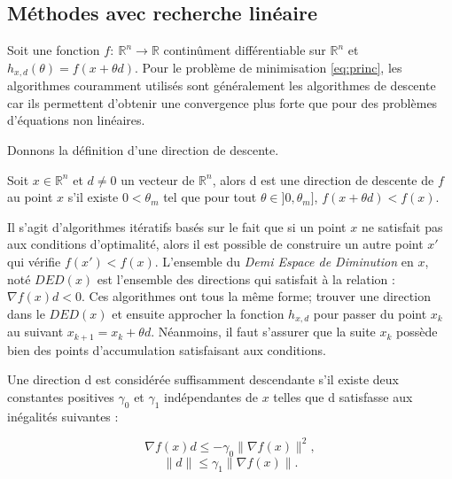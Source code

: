 \subsection{M\'ethodes avec recherche lin\'eaire}
Soit une fonction $f:\ \mathbb{R}^n \rightarrow \mathbb{R}$ continûment diff\'erentiable sur $\mathbb{R}^n$ et \\
$h_{x,d}(\theta)=f(x+\theta d)$.
Pour le probl\`eme de minimisation \eqref{eq:princ}, les algorithmes couramment utilis\'es sont g\'en\'eralement les algorithmes de
descente car ils permettent d'obtenir une convergence plus forte que pour des probl\`emes d'\'equations
non lin\'eaires.





 Donnons la d\'efinition d'une direction de descente.

\begin{frdefinition}
\label{def:1}
Soit $x \in \mathbb{R}^n$ et $d \neq 0$ un vecteur de $\mathbb{R}^n$, alors d est une direction de
descente de $f$ au point $x$ s'il existe $0<\theta_m$ tel que pour tout $\theta \in ]0,\theta_m]$,
$f(x+\theta d)<f(x)$. \\
\end{frdefinition}
%
Il s'agit d'algorithmes it\'eratifs bas\'es sur le fait que si un point $x$ ne satisfait pas aux conditions d'optimalit\'e, alors il est
possible de construire un autre point $x'$ qui v\'erifie $f(x')<f(x)$.
L'ensemble du {\it Demi Espace de Diminution} en $x$, not\'e $DED(x)$ est l'ensemble des directions qui satisfait \`a la relation :
$\nabla f(x)d<0$. Ces algorithmes ont tous la même forme;  trouver une direction dans le $DED(x)$ et
ensuite approcher la fonction $h_{x,d}$ pour passer du point $x_k$ au suivant $x_{k+1}=x_k+\theta d$. N\'eanmoins, il faut s'assurer que la suite ${x_k}$
poss\`ede bien des points d'accumulation satisfaisant aux conditions.


\begin{frdefinition}
\label{def:2}
 Une direction d est consid\'er\'ee suffisamment descendante s'il existe deux constantes positives $\gamma_0$ et $\gamma_1$
 ind\'ependantes de $x$ telles que d satisfasse aux in\'egalit\'es suivantes :

\begin{equation}  %
\label{equ:1}
\nabla f(x)d \leq -\gamma_0 \lVert \nabla f(x) \rVert^2 ,
\end{equation}
\begin{equation}
\label{equ:2}
\lVert d \rVert \leq \gamma_1 \lVert \nabla f(x) \rVert.
\end{equation}

\end{frdefinition}






